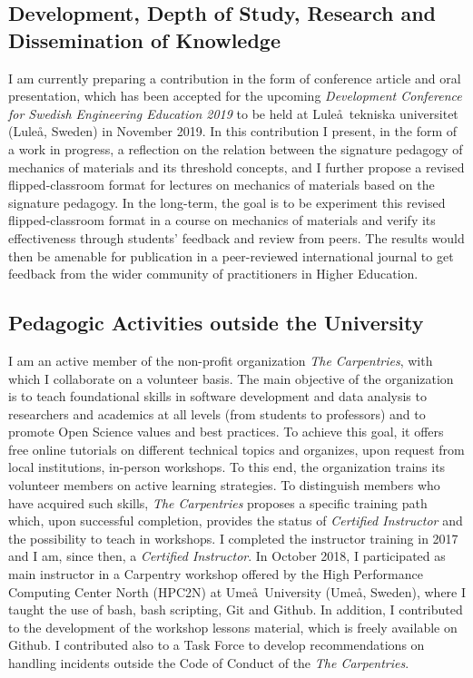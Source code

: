\documentclass[
  a4paper, 
]{fortysecondscv}
\begin{document}
\subsection{Development, Depth of Study, Research and Dissemination of Knowledge}
I am currently preparing a contribution in the form of conference article and oral presentation, which has been accepted for the upcoming \textit{Development Conference for Swedish Engineering Education 2019} to be held at Lule\aa\ tekniska universitet (Lule\aa, Sweden) in November 2019. In this contribution I present, in the form of a work in progress, a reflection on the relation between the signature pedagogy of mechanics of materials and its threshold concepts, and I further propose a revised flipped-classroom format for lectures on mechanics of materials based on the signature pedagogy. In the long-term, the goal is to be experiment this revised flipped-classroom format in a course on mechanics of materials and verify its effectiveness through students' feedback and review from peers. The results would then be amenable for publication in a peer-reviewed international journal to get feedback from the wider community of practitioners in Higher Education.

\subsection{Pedagogic Activities outside the University}
I am an active member of the non-profit organization \emph{The Carpentries}, with which I collaborate on a volunteer basis. The main objective of the organization is to teach foundational skills in software development and data analysis to researchers and academics at all levels (from students to professors) and to promote Open Science values and best practices. To achieve this goal, it offers free online tutorials on different technical topics and organizes, upon request from local institutions, in-person workshops. To this end, the organization trains its volunteer members on active learning strategies. To distinguish members who have acquired such skills, \emph{The Carpentries} proposes a specific training path which, upon successful completion, provides the status of \emph{Certified Instructor} and the possibility to teach in workshops. I completed the instructor training in 2017 and I am, since then, a \emph{Certified Instructor}. In October 2018, I participated as main instructor in a Carpentry workshop offered by the High Performance Computing Center North (HPC2N) at Ume\aa\ University (Ume\aa, Sweden), where I taught the use of bash, bash scripting, Git and Github. In addition, I contributed to the development of the workshop lessons material, which is freely available on Github. I contributed also to a Task Force to develop recommendations on handling incidents outside the Code of Conduct of the \emph{The Carpentries}.
\end{document}
